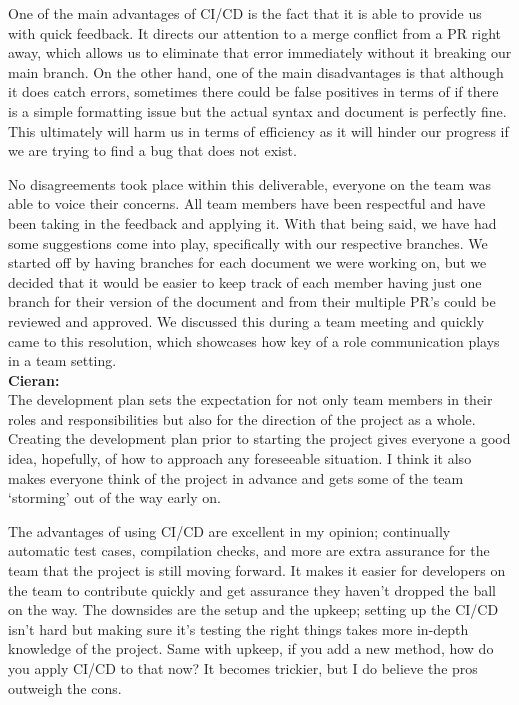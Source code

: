 \documentclass{article}
\begin{document}
One of the main advantages of CI/CD is the fact that it is able to provide us with quick feedback. It directs our attention to a merge conflict from a PR right away, which allows us to eliminate that error immediately without it breaking our main branch. On the other hand, one of the main disadvantages is that although it does catch errors, sometimes there could be false positives in terms of if there is a simple formatting issue but the actual syntax and document is perfectly fine. This ultimately will harm us in terms of efficiency as it will hinder our progress if we are trying to find a bug that does not exist.


No disagreements took place within this deliverable, everyone on the team was able to voice their concerns. All team members have been respectful and have been taking in the feedback and applying it. With that being said, we have had some suggestions come into play, specifically with our respective branches. We started off by having branches for each document we were working on, but we decided that it would be easier to keep track of each member having just one branch for their version of the document and from their multiple PR’s could be reviewed and approved. We discussed this during a team meeting and quickly came to this resolution, which showcases how key of a role communication plays in a team setting. \\

\noindent \textbf{Cieran:}\\
The development plan sets the expectation for not only team members in their roles and responsibilities but also for the direction of the project as a whole. Creating the development plan prior to starting the project gives everyone a good idea, hopefully, of how to approach any foreseeable situation. I think it also makes everyone think of the project in advance and gets some of the team ‘storming’ out of the way early on.

The advantages of using CI/CD are excellent in my opinion; continually automatic test cases, compilation checks, and more are extra assurance for the team that the project is still moving forward. It makes it easier for developers on the team to contribute quickly and get assurance they haven’t dropped the ball on the way. The downsides are the setup and the upkeep; setting up the CI/CD isn’t hard but making sure it’s testing the right things takes more in-depth knowledge of the project. Same with upkeep, if you add a new method, how do you apply CI/CD to that now? It becomes trickier, but I do believe the pros outweigh the cons.
\end{document}
